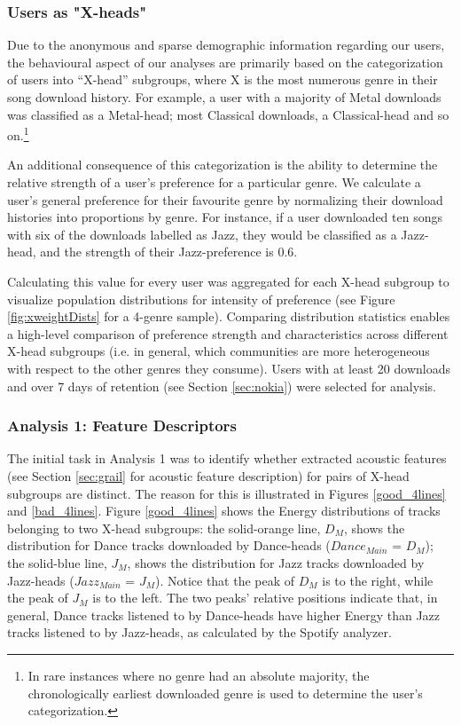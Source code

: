\documentclass[a4paper]{article}
\begin{document}
\subsubsection{Users as "X-heads"}\label{sec:xhead}
Due to the anonymous and sparse demographic information regarding our users, the behavioural aspect of our analyses are primarily based on the categorization of users into “X-head” subgroups, where X is the most numerous genre in their song download history. For example, a user with a majority of Metal downloads was classified as a Metal-head; most Classical downloads, a Classical-head and so on.\footnote{In rare instances where no genre had an absolute majority, the chronologically earliest downloaded genre is used to determine the user’s categorization.}

An additional consequence of this categorization is the ability to determine the relative strength of a user's preference for a particular genre. We calculate a user's general preference for their favourite genre by normalizing their download histories into proportions by genre. For instance, if a user downloaded ten songs with six of the downloads labelled as Jazz, they would be classified as a Jazz-head, and the strength of their Jazz-preference is 0.6. 

Calculating this value for every user was aggregated for each X-head subgroup to visualize population distributions for intensity of preference (see Figure \ref{fig:xweightDists} for a 4-genre sample). Comparing distribution statistics enables a high-level comparison of preference strength and characteristics across different X-head subgroups (i.e. in general, which communities are more heterogeneous with respect to the other genres they consume). Users with at least 20 downloads and over 7 days of retention (see Section \ref{sec:nokia}) were selected for analysis.

\subsubsection{Analysis 1: Feature Descriptors}\label{sec:leaky_anal_1}
The initial task in Analysis 1 was to identify whether extracted acoustic features (see Section \ref{sec:grail} for acoustic feature description) for pairs of X-head subgroups are distinct. The reason for this is illustrated in Figures \ref{good_4lines} and \ref{bad_4lines}. Figure \ref{good_4lines} shows the Energy distributions of tracks belonging to two X-head subgroups: the solid-orange line, $D_M$, shows the distribution for Dance tracks downloaded by Dance-heads ($Dance_{\textit{Main}}$ = $D_M$); the solid-blue line, $J_M$, shows the distribution for Jazz tracks downloaded by Jazz-heads ($Jazz_{\textit{Main}}$ = $J_M$). Notice that the peak of $D_M$ is to the right, while the peak of $J_M$ is to the left. The two peaks’ relative positions indicate that, in general, Dance tracks listened to by Dance-heads have higher Energy than Jazz tracks listened to by Jazz-heads, as calculated by the Spotify analyzer. 
\end{document}
